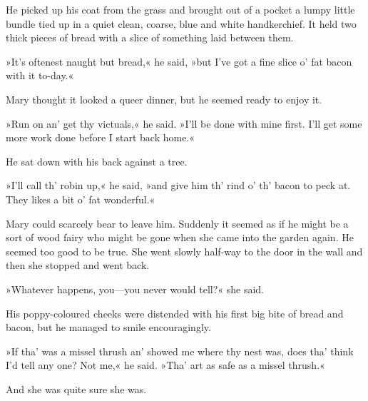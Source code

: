He picked up his coat from the grass and brought out of a pocket a lumpy little bundle tied up in a quiet clean, coarse, blue and white handkerchief. It held two thick pieces of bread with a slice of something laid between them.

»It's oftenest naught but bread,« he said, »but I've got a fine slice o' fat bacon with it to-day.«

Mary thought it looked a queer dinner, but he seemed ready to enjoy it.

»Run on an' get thy victuals,« he said. »I'll be done with mine first. I'll get some more work done before I start back home.«

He sat down with his back against a tree.

»I'll call th' robin up,« he said, »and give him th' rind o' th' bacon to peck at. They likes a bit o' fat wonderful.«

Mary could scarcely bear to leave him. Suddenly it seemed as if he might be a sort of wood fairy who might be gone when she came into the garden again. He seemed too good to be true. She went slowly half-way to the door in the wall and then she stopped and went back.

»Whatever happens, you—you never would tell?« she said.

His poppy-coloured cheeks were distended with his first big bite of bread and bacon, but he managed to smile encouragingly.

»If tha' was a missel thrush an' showed me where thy nest was, does tha' think I'd tell any one? Not me,« he said. »Tha' art as safe as a missel thrush.«

And she was quite sure she was.